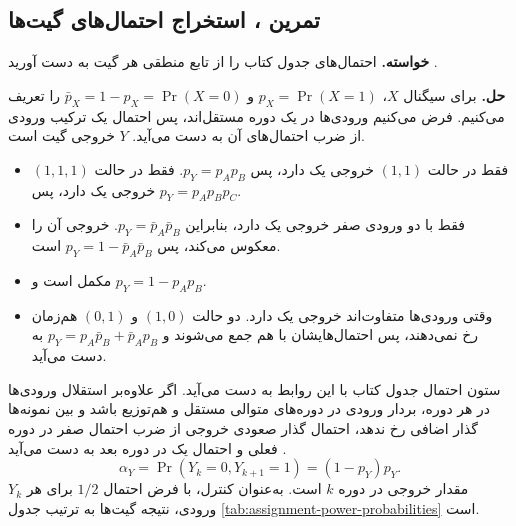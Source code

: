 \subsection{تمرین ، استخراج احتمال‌های گیت‌ها}
\label{sec:assignment-power-probability}

\textbf{خواسته.}
احتمال‌های جدول  کتاب را از تابع منطقی هر گیت به دست
آورید \cite[جدول ، صفحه ۱۸۷ و تمرین ،
صفحه ۲۰۹]{weste}.

\textbf{حل.}
برای سیگنال \(X\)، \(p_X=\Pr(X=1)\) و
\(\bar p_X=1-p_X=\Pr(X=0)\) را تعریف می‌کنیم. فرض می‌کنیم
ورودی‌ها در یک دوره مستقل‌اند، پس احتمال یک ترکیب ورودی از ضرب
احتمال‌های آن به دست می‌آید. \(Y\) خروجی گیت است.

\begin{itemize}
  \item {} فقط در حالت \((1,1)\) خروجی یک دارد، پس
    \(p_Y=p_Ap_B\).  فقط در حالت \((1,1,1)\)
    خروجی یک دارد، پس \(p_Y=p_Ap_Bp_C\).
  \item {} فقط با دو ورودی صفر خروجی یک دارد، بنابراین
    \(p_Y=\bar p_A\bar p_B\).  خروجی آن را معکوس می‌کند،
    پس \(p_Y=1-\bar p_A\bar p_B\) است.
  \item {} مکمل  است و \(p_Y=1-p_Ap_B\).
  \item {} وقتی ورودی‌ها متفاوت‌اند خروجی یک دارد. دو
    حالت \((1,0)\) و \((0,1)\) هم‌زمان رخ نمی‌دهند، پس
    احتمال‌هایشان با هم جمع می‌شوند و
    \(p_Y=p_A\bar p_B+\bar p_Ap_B\) به دست می‌آید.
\end{itemize}

ستون احتمال جدول کتاب با این روابط به دست می‌آید. اگر علاوه‌بر
استقلال ورودی‌ها در هر دوره، بردار ورودی در دوره‌های متوالی مستقل
و هم‌توزیع باشد و بین نمونه‌ها گذار اضافی رخ ندهد، احتمال گذار
صعودی خروجی از ضرب احتمال صفر در دوره فعلی و احتمال یک در دوره
بعد به دست می‌آید \cite[رابطه ، صفحه ۱۸۷]{weste}.
\[
  \alpha_Y=\Pr(Y_k=0,Y_{k+1}=1)
          =(1-p_Y)p_Y.
\]
\(Y_k\) مقدار خروجی در دوره \(k\) است. به‌عنوان کنترل، با فرض
احتمال \(1/2\) برای هر ورودی، نتیجه گیت‌ها به ترتیب جدول
\ref{tab:assignment-power-probabilities} است.

